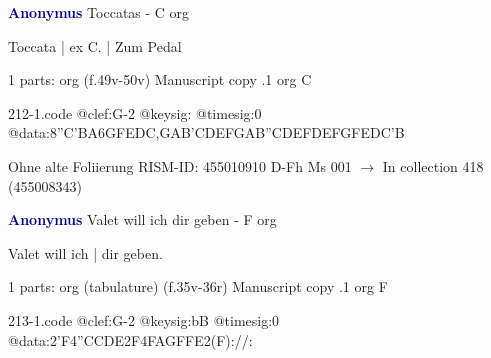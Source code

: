 \documentclass[twocolumn]{book}
\begin{document}
\newline \par \vspace{7pt} \textcolor{darkblue}{\textbf{Anonymus  }}
\newline Toccatas - C
\newline org
\newline \begin{itshape}[f.49v, at left:] Toccata | ex C. | Zum Pedal\end{itshape} 
\newline \textcolor{darkblue}{}  1 parts: org  (f.49v-50v)
\newline Manuscript copy
.1  org  C  
\begin{filecontents*}{212-1.code}
@clef:G-2
@keysig:
@timesig:0
@data:8''C{'BA}{6GFED}{C,GAB}{'CDEF}{GAB''C}{DEFD}{EFGF}{EDC'B}
\end{filecontents*}
\newline
%

\newline Ohne alte Foliierung
\newline RISM-ID: 455010910
\newline D-Fh  Ms 001
\newline $\rightarrow$ In collection 418 (455008343)
      
\newline \par \vspace{7pt} \textcolor{darkblue}{\textbf{Anonymus  }}
\newline Valet will ich dir geben - F
\newline org
\newline \begin{itshape}[f.35v, at left:] Valet will ich | dir geben.\end{itshape} 
\newline \textcolor{darkblue}{}  1 parts: org (tabulature)  (f.35v-36r)
\newline Manuscript copy
.1  org  F  
\begin{filecontents*}{213-1.code}
@clef:G-2
@keysig:bB
@timesig:0
@data:2'F4''CCDE2F4FAGFFE2(F)://:
\end{filecontents*}
\newline
%
\end{document}
